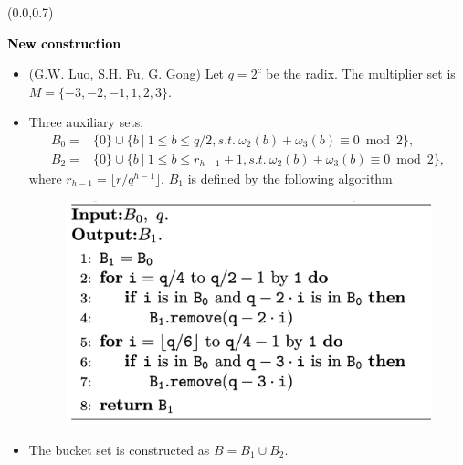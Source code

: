 \documentclass{beamer}                  %
\newcommand{\UW}[1]{\textbf{\textcolor{black}{#1}}}
\newcommand{\UWtitle}[1]{
	\begin{textblock}{12.8}(0.0,0.7)
		\begin{center} 
			\textbf{\UW{\Large{#1}}}
		\end{center}
	\end{textblock}
}
\newcommand{\fillframe}{\vspace*{10cm}}
\begin{document}
\begin{frame}
\small
	\UWtitle{New construction}
	\vspace*{0.9cm}

		\begin{itemize}	
			\item<1-> (G.W. Luo, S.H. Fu,  G. Gong) Let $q = 2^c$ be the radix. The multiplier set is 
			$M =\{-3,-2,-1,1,2,3\}$.
			\item<2->  Three auxiliary sets,
			\begin{equation*}
			\begin{aligned}
			B_0 =& \{0\} \cup \{b\ |\ 1\le b \le q/2, s.t.\ \omega_2(b) +\omega_3(b) \equiv 0 \bmod 2 \},\\
			B_2 =& \{0\} \cup \{b\ |\ 1\le b \le r_{h-1}+1, s.t.\ \omega_2(b) +\omega_3(b) \equiv 0 \bmod 2 \},
			\end{aligned}
			\end{equation*}
			where $r_{h-1}=\lfloor r/q^{h-1}\rfloor$. $B_1$ is defined by the following algorithm
				\begin{center}
				\begin{figure}
					\centering
					\includegraphics[width=0.63\linewidth]{Figures/alg_B1}
				\end{figure}
				\end{center}
%					
			\item<2-> The bucket set is constructed as $B = B_1 \cup B_2$.	
		\end{itemize}

	\fillframe
\end{frame}
\end{document}
